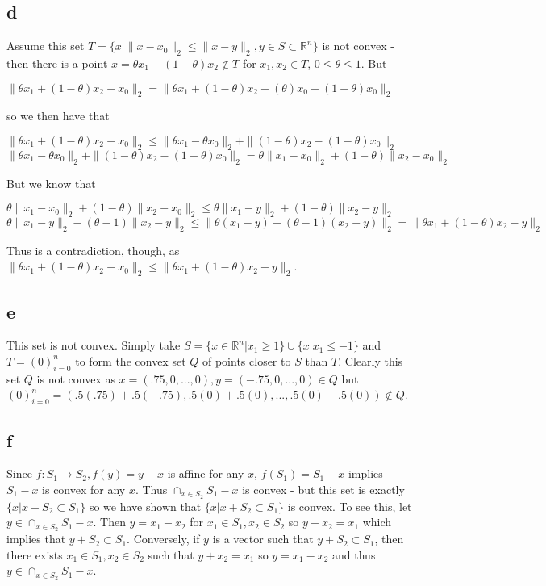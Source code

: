 \documentclass{article}
\begin{document}
\subsection*{d}
Assume this set $T = \{x | \|x-x_0\|_2 \leq \|x - y\|_2, y \in S \subset \mathbb{R}^n\}$ is not convex - then there is a point $x = \theta x_1 + (1-\theta) x_2 \notin T$ for $x_1, x_2 \in T$, $0 \leq \theta \leq 1 $.  But 
\begin{center}
    $\|\theta x_1 + (1-\theta)  x_2 - x_0\|_2  = \|\theta x_1 + (1-\theta)  x_2 - (\theta) x_0 - (1 - \theta)x_0\|_2$
\end{center}
so we then have that
\begin{center}
    $\|\theta x_1 + (1-\theta)  x_2 - x_0\|_2  \leq \|\theta x_1 - \theta x_0\|_2  + \|(1-\theta)  x_2 - (1 - \theta)x_0\|_2$
    $\|\theta x_1 - \theta x_0\|_2  + \|(1-\theta)  x_2 - (1 - \theta)x_0\|_2 = \theta \| x_1 - x_0\|_2 + (1 - \theta) \|x_2 - x_0\|_2$
\end{center}
But we know that 
\begin{center}
    $\theta \| x_1 - x_0\|_2 + (1 - \theta) \|x_2 - x_0\|_2 \leq \theta \|x_1 - y\|_2 + (1 - \theta)\|x_2 - y\|_2$\\
    $ \theta \|x_1 - y\|_2 - (\theta - 1)\|x_2 - y\|_2 \leq \| \theta (x_1 - y) - (\theta - 1)(x_2 - y)\|_2 =  \| \theta x_1 + (1-\theta)x_2 - y\|_2$
\end{center}
Thus is a contradiction, though, as $\|\theta x_1 + (1-\theta)  x_2 - x_0\|_2 \leq \| \theta x_1 + (1-\theta)x_2 - y\|_2$.
\subsection*{e}
This set is not convex.  Simply take $S = \{x \in \mathbb{R}^n| x_1 \geq 1\} \cup \{x | x_1 \leq -1\}$ and $T = {(0)_{i=0}^n}$ to form the convex set $Q$ of points closer to $S$ than $T$.  Clearly this set $Q$ is not convex as $x = (.75, 0, ..., 0), y= (-.75, 0, ..., 0) \in Q$ but $(0)_{i=0}^n = (.5(.75) + .5(-.75), .5(0) + .5(0), ..., .5(0) + .5(0)) \notin Q$. 
\subsection*{f}
Since $f: S_1 \rightarrow S_2, f(y) = y - x$ is affine for any $x$, $f(S_1) = S_1 - x$ implies $S_1 - x$ is convex for any $x$.  Thus $\cap_{x \in S_2} S_1 - x$ is convex - but this set is exactly $\{x | x + S_2 \subset S_1\}$ so we have shown that $\{x | x + S_2 \subset S_1\}$ is convex.  To see this, let $y \in \cap_{x \in S_2} S_1 - x$.  Then $y = x_1 - x_2$ for $x_1 \in S_1, x_2 \in S_2$ so $y + x_2 = x_1$ which implies that $y + S_2 \subset S_1$.  Conversely, if $y$ is a vector such that $y + S_2 \subset S_1$, then there exists  $x_1 \in S_1, x_2 \in S_2$ such that $y + x_2 = x_1$ so $y = x_1 - x_2$ and thus $y \in \cap_{x \in S_2} S_1 - x$.
\end{document}
